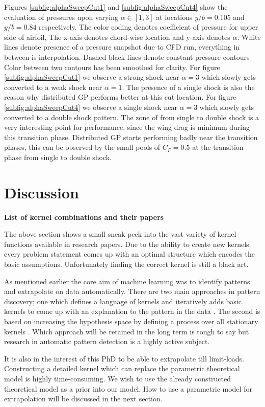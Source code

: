 Figures \ref{subfig:alphaSweepCut1} and \ref{subfig:alphaSweepCut4} show the evaluation of pressures upon varying $\alpha \in [1, 3]$ at locations $y/b = 0.105$ and $y/b = 0.84$ respectively. The color coding denotes coefficient of pressure for upper side of airfoil, The x-axis denotes chord-wise location and y-axis denotes $\alpha$. White lines denote presence of a pressure snapshot due to CFD run, everything in between is interpolation. Dashed black lines denote constant pressure contours Color between two contours has been smoothed for clarity. For figure \ref{subfig:alphaSweepCut1} we observe a strong shock near $\alpha = 3$ which slowly gets converted to a weak shock near $\alpha = 1$. The presence of a single shock is also the reason why distributed GP performs better at this cut location. For figure \ref{subfig:alphaSweepCut4} we observe a single shock near $\alpha = 3$ which slowly gets converted to a double shock pattern. The zone of from single to double shock is a very interesting point for performance, since the wing drag is minimum during this transition phase. Distributed GP starts performing badly near the transition phases, this can be observed by the small pools of $C_{P} = 0.5$ at the transition phase from single to double shock. 


\section{Discussion}\label{subsec:ExpressingStructureKernelConclusion}
\textbf{List of kernel combinations and their papers}

The above section shows a small sneak peek into the vast variety of kernel functions available in research papers. Due to the ability to create new kernels every problem statement comes up with an optimal structure which encodes the basic assumptions. Unfortunately finding the correct kernel is still a black art. 
 
As mentioned earlier the core aim of machine learning was to identify patterns and extrapolate on data automatically. There are two main approaches in pattern discovery; one which defines a language of kernels and iteratively adds basic kernels to come up with an explanation to the pattern in the data \cite{lloyd2014automatic}. The second is based on increasing the hypothesis space by defining a process over all stationary kernels \cite{wilson2012process}. Which approach will be retained in the long term is tough to say but research in automatic pattern detection is a highly active subject. 

It is also in the interest of this PhD to be able to extrapolate till limit-loads. Constructing a detailed kernel which can replace the parametric theoretical model is highly time-consuming. We wish to use the already constructed theoretical model as a prior into our model. How to use a parametric model for extrapolation will be discussed in the next section.
